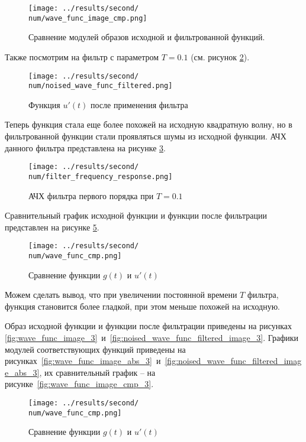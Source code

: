 \begin{figure}[ht!]
    \centering
    \texttt{[image: ../results/second/\\num/wave\_func\_image\_cmp.png]}
    \caption{Сравнение модулей образов исходной и фильтрованной функций.}
    \label{fig:wave_func_image_cmp_\num}
\end{figure}


\FloatBarrier
\def\num{3}
\def\T{0.1}
Также посмотрим на фильтр с параметром $T = \T$ (см. рисунок \ref{fig:noised_wave_func_filtered_\num}).
\begin{figure}[ht!]
    \centering
    \texttt{[image: ../results/second/\\num/noised\_wave\_func\_filtered.png]}
    \caption{Функция $u'(t)$ после применения фильтра}
    \label{fig:noised_wave_func_filtered_\num}
\end{figure}
Теперь функция стала еще более похожей на исходную квадратную волну, но в фильтрованной функции 
стали проявляться шумы из исходной функции. 
АЧХ данного фильтра представлена на рисунке \ref{fig:filter_frequency_response_\num}.

\begin{figure}[ht!]
    \centering
    \texttt{[image: ../results/second/\\num/filter\_frequency\_response.png]}
    \caption{АЧХ фильтра первого порядка при $T = \T$}
    \label{fig:filter_frequency_response_\num}
\end{figure}

Сравнительный график исходной функции и функции после фильтрации представлен на рисунке \ref{fig:wave_func_cmp_\num}.

\begin{figure}[ht!]
    \centering
    \texttt{[image: ../results/second/\\num/wave\_func\_cmp.png]}
    \caption{Сравнение функции $g(t)$ и $u'(t)$}
    \label{fig:wave_func_cmp_\num}
\end{figure}

Можем сделать вывод, что при увеличении постоянной времени $T$ фильтра, функция становится более гладкой,
при этом меньше похожей на исходную. 

Образ исходной функции и функции после фильтрации приведены на рисунках \ref{fig:wave_func_image_\num}~и~\ref{fig:noised_wave_func_filtered_image_\num}.
Графики модулей соответствующих функций приведены на рисунках~\ref{fig:wave_func_image_abs_\num}~и~\ref{fig:noised_wave_func_filtered_image_abs_\num}, их 
сравнительный график -- на рисунке~\ref{fig:wave_func_image_cmp_\num}.

\begin{figure}[ht!]
    \centering
    \texttt{[image: ../results/second/\\num/wave\_func\_cmp.png]}
    \caption{Сравнение функции $g(t)$ и $u'(t)$}
    \label{fig:wave_func_cmp_\num}
\end{figure}

